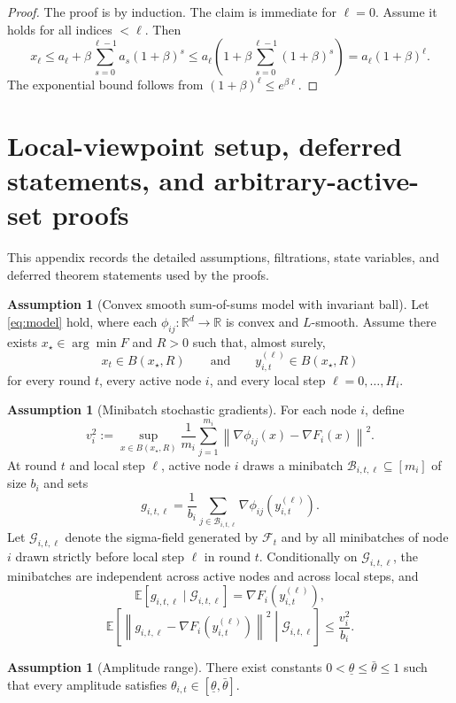 \documentclass{article}
\theoremstyle{definition}
\newtheorem{assumption}[theorem]{Assumption}
\newcommand{\RR}{\mathbb R}
\newcommand{\EE}{\mathbb E}
\newcommand{\cF}{\mathcal F}
\newcommand{\cG}{\mathcal G}
\newcommand{\norm}[1]{\left\lVert #1\right\rVert}
\begin{document}
\begin{proof}
The proof is by induction. The claim is immediate for $\ell=0$. Assume it holds for all indices $<\ell$. Then
\[
x_\ell\le a_\ell+\beta\sum_{s=0}^{\ell-1}a_s(1+\beta)^s
\le a_\ell\left(1+\beta\sum_{s=0}^{\ell-1}(1+\beta)^s\right)
= a_\ell(1+\beta)^\ell.
\]
The exponential bound follows from $(1+\beta)^\ell\le e^{\beta\ell}$.
\end{proof}

\section{Local-viewpoint setup, deferred statements, and arbitrary-active-set proofs}

This appendix records the detailed assumptions, filtrations, state variables, and deferred theorem statements used by the proofs.

\begin{assumption}[Convex smooth sum-of-sums model with invariant ball]
\label{ass:model}
Let \eqref{eq:model} hold, where each $\phi_{ij}:\RR^d\to\RR$ is convex and $L$-smooth. Assume there exists $x_\star\in\arg\min F$ and $R>0$ such that, almost surely,
\[
x_t\in B(x_\star,R)
\qquad\text{and}\qquad
y_{i,t}^{(\ell)}\in B(x_\star,R)\]
for every round $t$, every active node $i$, and every local step $\ell=0,\dots,H_i$.
\end{assumption}

\begin{assumption}[Minibatch stochastic gradients]
\label{ass:oracle}
For each node $i$, define
\[
v_i^2
:=
\sup_{x\in B(x_\star,R)}
\frac1{m_i}\sum_{j=1}^{m_i}
\norm{\nabla \phi_{ij}(x)-\nabla F_i(x)}^2.\]
At round $t$ and local step $\ell$, active node $i$ draws a minibatch
$\mathcal B_{i,t,\ell}\subseteq[m_i]$ of size $b_i$ and sets
\[
g_{i,t,\ell}
=
\frac1{b_i}\sum_{j\in\mathcal B_{i,t,\ell}}
\nabla \phi_{ij}(y_{i,t}^{(\ell)}).\]
Let $\cG_{i,t,\ell}$ denote the sigma-field generated by $\cF_t$ and by all
minibatches of node $i$ drawn strictly before local step $\ell$ in round $t$.
Conditionally on $\cG_{i,t,\ell}$, the minibatches are independent across active
nodes and across local steps, and
\[
\EE[g_{i,t,\ell}\mid \cG_{i,t,\ell}]
=
\nabla F_i(y_{i,t}^{(\ell)}),\]
\[
\EE\!\left[
\norm{g_{i,t,\ell}-\nabla F_i(y_{i,t}^{(\ell)})}^2
\middle|
\cG_{i,t,\ell}
\right]
\le
\frac{v_i^2}{b_i}.\]
\end{assumption}

\begin{assumption}[Amplitude range]
There exist constants $0<\underline\theta\le \bar\theta\le 1$
such that every amplitude satisfies
$
\theta_{i,t}\in[\underline\theta,\bar\theta]$.

\end{assumption}
\end{document}
